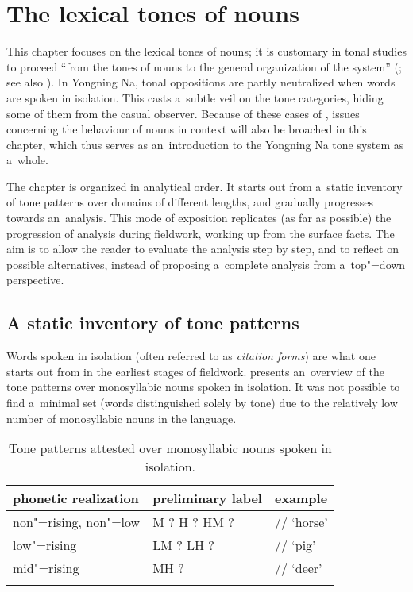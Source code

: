 \chapter{The lexical tones of nouns}
\label{chap:thelexicaltonesofnouns}

This chapter focuses on the lexical tones of nouns; it is customary in tonal studies to proceed “from the tones of nouns to the general organization of the system” (\citealt{riallandetal1989}; see also \citealt[526-527]{hyman2014}). In Yongning Na, tonal oppositions are partly neutralized when words are spoken in isolation. This casts a~subtle veil on the tone categories, hiding some of them from the casual observer. Because of these cases of , issues concerning the behaviour of nouns in context will also be broached in this chapter, which thus
serves as an~introduction to the Yongning Na tone system as a~whole.

The chapter is organized in analytical order. It starts out from a~static inventory of tone patterns
over domains of different lengths, and gradually progresses towards an~analysis. This mode of
exposition replicates (as far as possible) the progression of analysis during fieldwork, working up from the surface
facts. The aim is to allow the reader to evaluate the analysis step by step, and to reflect on
possible alternatives, instead of proposing a~complete analysis from a~top"=down perspective.


\section{A static inventory of tone patterns}
\label{sec:astaticinventoryoftonepatterns}

Words spoken in isolation (often referred to as \textit{citation forms}) are what one starts out from in the earliest stages of
fieldwork.  presents
an~overview of the tone patterns over monosyllabic nouns spoken in isolation. It was not possible to find
a~minimal set (words distinguished solely by tone) due to the relatively low number of monosyllabic
nouns in the language.

\begin{table}%
  \caption{Tone patterns attested over monosyllabic nouns spoken in isolation.}
\begin{tabularx}{\textwidth}{ Q Q Q }
  \lsptoprule
	phonetic realization & preliminary label & example\\\midrule
	non"=rising, non"=low & M ? H ? HM ? & // ‘horse’\\
	low"=rising & LM ? LH ? & // ‘pig’\\
	mid"=rising & MH ? & // ‘deer’\\
\lspbottomrule
\end{tabularx}
\label{tab:tonepatternsattestedovermonosyllabicnounsspokeninisolation}
\end{table}

